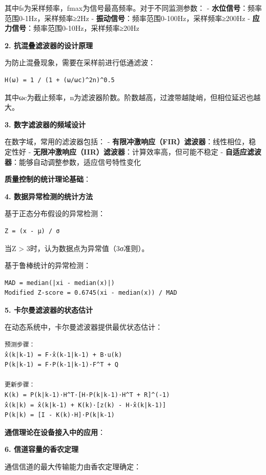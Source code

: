其中fs为采样频率，fmax为信号最高频率。对于不同监测参数： - \textbf{水位信号}：频率范围0-1Hz，采样频率≥2Hz - \textbf{振动信号}：频率范围0-100Hz，采样频率≥200Hz - \textbf{应力信号}：频率范围0-10Hz，采样频率≥20Hz

\textbf{2. 抗混叠滤波器的设计原理}

为防止混叠现象，需要在采样前进行低通滤波：

\begin{lstlisting}
H(ω) = 1 / (1 + (ω/ωc)^2n)^0.5
\end{lstlisting}

其中ωc为截止频率，n为滤波器阶数。阶数越高，过渡带越陡峭，但相位延迟也越大。

\textbf{3. 数字滤波器的频域设计}

在数字域，常用的滤波器包括： - \textbf{有限冲激响应（FIR）滤波器}：线性相位，稳定性好 - \textbf{无限冲激响应（IIR）滤波器}：计算效率高，但可能不稳定 - \textbf{自适应滤波器}：能够自动调整参数，适应信号特性变化

\textbf{质量控制的统计理论基础}：

\textbf{4. 数据异常检测的统计方法}

基于正态分布假设的异常检测：

\begin{lstlisting}
Z = (x - μ) / σ
\end{lstlisting}

当\textbar Z\textbar{} \textgreater{} 3时，认为数据点为异常值（3σ准则）。

基于鲁棒统计的异常检测：

\begin{lstlisting}
MAD = median(|xi - median(x)|)
Modified Z-score = 0.6745(xi - median(x)) / MAD
\end{lstlisting}

\textbf{5. 卡尔曼滤波器的状态估计}

在动态系统中，卡尔曼滤波器提供最优状态估计：

\begin{lstlisting}
预测步骤：
x̂(k|k-1) = F·x̂(k-1|k-1) + B·u(k)
P(k|k-1) = F·P(k-1|k-1)·F^T + Q

更新步骤：
K(k) = P(k|k-1)·H^T·[H·P(k|k-1)·H^T + R]^(-1)
x̂(k|k) = x̂(k|k-1) + K(k)·[z(k) - H·x̂(k|k-1)]
P(k|k) = [I - K(k)·H]·P(k|k-1)
\end{lstlisting}

\textbf{通信理论在设备接入中的应用}：

\textbf{6. 信道容量的香农定理}

通信信道的最大传输能力由香农定理确定：

